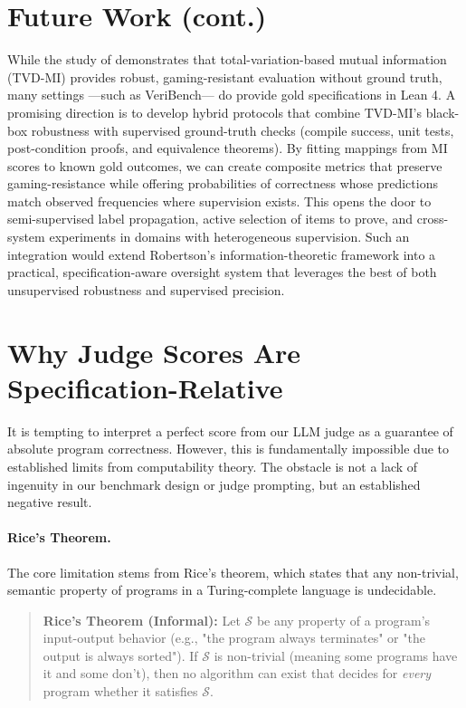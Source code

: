 \documentclass{article}
\begin{document}
\section{Future Work (cont.)}

While the study of \citet{robertson2025stepbystep} demonstrates that total-variation-based mutual information (TVD-MI) provides robust, gaming-resistant evaluation without ground truth, many settings —such as VeriBench— do provide gold specifications in Lean 4.
A promising direction is to develop hybrid protocols that combine TVD-MI’s black-box robustness with supervised ground-truth checks (compile success, unit tests, post-condition proofs, and equivalence theorems).
By fitting mappings from MI scores to known gold outcomes, we can create composite metrics that preserve gaming-resistance while offering probabilities of correctness whose predictions match observed frequencies where supervision exists.
This opens the door to semi-supervised label propagation, active selection of items to prove, and cross-system experiments in domains with heterogeneous supervision.
Such an integration would extend Robertson’s information-theoretic framework into a practical, specification-aware oversight system that leverages the best of both unsupervised robustness and supervised precision.

\section{Why Judge Scores Are Specification-Relative}

It is tempting to interpret a perfect score from our LLM judge as a guarantee of absolute program correctness. However, this is fundamentally impossible due to established limits from computability theory. The obstacle is not a lack of ingenuity in our benchmark design or judge prompting, but an established negative result.

\paragraph{Rice’s Theorem.}
The core limitation stems from Rice’s theorem, which states that any non-trivial, semantic property of programs in a Turing-complete language is undecidable.

\begin{quote}
  \textbf{Rice's Theorem (Informal):} Let $\mathcal{S}$ be any property of a program's input-output behavior (e.g., "the program always terminates" or "the output is always sorted"). If $\mathcal{S}$ is non-trivial (meaning some programs have it and some don't), then no algorithm can exist that decides for \emph{every} program whether it satisfies $\mathcal{S}$.
\end{quote}
\end{document}
